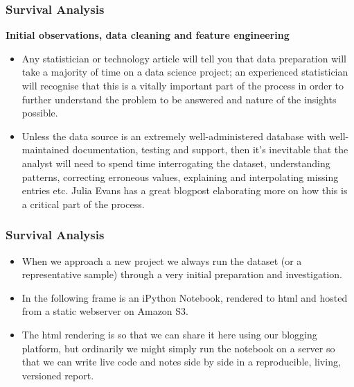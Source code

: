 \documentclass[]{beamer}
\begin{document}
	\begin{frame}
		\frametitle{Survival Analysis}
		
		\noindent \textbf{Initial observations, data cleaning and feature engineering}
		\begin{itemize}
			\item Any statistician or technology article will tell you that data preparation will take a majority of time on a data science project; an experienced statistician will recognise that this is a vitally important part of the process in order to further understand the problem to be answered and nature of the insights possible.
			
			\item Unless the data source is an extremely well-administered database with well-maintained documentation, testing and support, then it's inevitable that the analyst will need to spend time interrogating the dataset, understanding patterns, correcting erroneous values, explaining and interpolating missing entries etc. Julia Evans has a great blogpost elaborating more on how this is a critical part of the process. 
		\end{itemize}
		
	\end{frame}
	\begin{frame}
		\frametitle{Survival Analysis}
		\begin{itemize}
			\item When we approach a new project we always run the dataset (or a representative sample) through a very initial preparation and investigation. 
			\item In the following frame is an iPython Notebook, rendered to html and hosted from a static webserver on Amazon S3. 
			\item The html rendering is so that we can share it here using our blogging platform, but ordinarily we might simply run the notebook on a server so that we can write live code and notes side by side in a reproducible, living, versioned report.
		\end{itemize}
		
		
	\end{frame}
\end{document}
